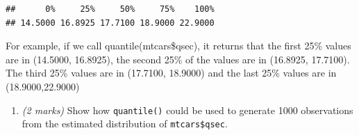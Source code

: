 \documentclass[
  9pt,
]{article}
\newenvironment{Shaded}{\begin{snugshade}}{\end{snugshade}}
\newcommand{\DataTypeTok}[1]{\textcolor[rgb]{0.13,0.29,0.53}{#1}}
\newcommand{\DecValTok}[1]{\textcolor[rgb]{0.00,0.00,0.81}{#1}}
\newcommand{\KeywordTok}[1]{\textcolor[rgb]{0.13,0.29,0.53}{\textbf{#1}}}
\newcommand{\NormalTok}[1]{#1}
\newcommand{\OperatorTok}[1]{\textcolor[rgb]{0.81,0.36,0.00}{\textbf{#1}}}
\newcommand{\StringTok}[1]{\textcolor[rgb]{0.31,0.60,0.02}{#1}}
\providecommand{\tightlist}{%
  \setlength{\itemsep}{0pt}\setlength{\parskip}{0pt}}
\begin{document}
\begin{enumerate}
\begin{enumerate}
\begin{Shaded}
\end{Shaded}

\begin{verbatim}
##      0%     25%     50%     75%    100% 
## 14.5000 16.8925 17.7100 18.9000 22.9000
\end{verbatim}

    For example, if we call quantile(mtcars\$qsec), it returns that the
    first 25\% values are in (14.5000, 16.8925), the second 25\% of the
    values are in (16.8925, 17.7100). The third 25\% values are in
    (17.7100, 18.9000) and the last 25\% values are in (18.9000,22.9000)

    \begin{enumerate}
    \def\labelenumiii{\roman{enumiii}.}
    \setcounter{enumiii}{1}
    \tightlist
    \item
      \emph{(2 marks)} Show how \texttt{quantile()} could be used to
      generate 1000 observations from the estimated distribution of
      \texttt{mtcars\$qsec}.
    \end{enumerate}
  \end{enumerate}
\end{enumerate}

\begin{Shaded}
\end{Shaded}
\end{document}
